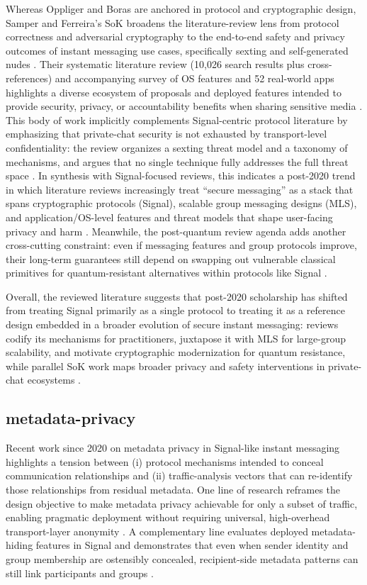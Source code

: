 Whereas Oppliger and Boras are anchored in protocol and cryptographic design, Samper and Ferreira’s SoK broadens the literature-review lens from protocol correctness and adversarial cryptography to the end-to-end safety and privacy outcomes of instant messaging use cases, specifically sexting and self-generated nudes \cite{samper2025}. Their systematic literature review (10{,}026 search results plus cross-references) and accompanying survey of OS features and 52 real-world apps highlights a diverse ecosystem of proposals and deployed features intended to provide security, privacy, or accountability benefits when sharing sensitive media \cite{samper2025}. This body of work implicitly complements Signal-centric protocol literature by emphasizing that private-chat security is not exhausted by transport-level confidentiality: the review organizes a sexting threat model and a taxonomy of mechanisms, and argues that no single technique fully addresses the full threat space \cite{samper2025}. In synthesis with Signal-focused reviews, this indicates a post-2020 trend in which literature reviews increasingly treat “secure messaging” as a stack that spans cryptographic protocols (Signal), scalable group messaging designs (MLS), and application/OS-level features and threat models that shape user-facing privacy and harm \cite{oppliger2024,samper2025}. Meanwhile, the post-quantum review agenda adds another cross-cutting constraint: even if messaging features and group protocols improve, their long-term guarantees still depend on swapping out vulnerable classical primitives for quantum-resistant alternatives within protocols like Signal \cite{boras2025}.

Overall, the reviewed literature suggests that post-2020 scholarship has shifted from treating Signal primarily as a single protocol to treating it as a reference design embedded in a broader evolution of secure instant messaging: reviews codify its mechanisms for practitioners, juxtapose it with MLS for large-group scalability, and motivate cryptographic modernization for quantum resistance, while parallel SoK work maps broader privacy and safety interventions in private-chat ecosystems \cite{oppliger2024,boras2025,samper2025}.

\subsection{metadata-privacy}
Recent work since 2020 on metadata privacy in Signal-like instant messaging highlights a tension between (i) protocol mechanisms intended to conceal communication relationships and (ii) traffic-analysis vectors that can re-identify those relationships from residual metadata. One line of research reframes the design objective to make metadata privacy achievable for only a subset of traffic, enabling pragmatic deployment without requiring universal, high-overhead transport-layer anonymity \cite{nelson2024}. A complementary line evaluates deployed metadata-hiding features in Signal and demonstrates that even when sender identity and group membership are ostensibly concealed, recipient-side metadata patterns can still link participants and groups \cite{brigham2025}.

